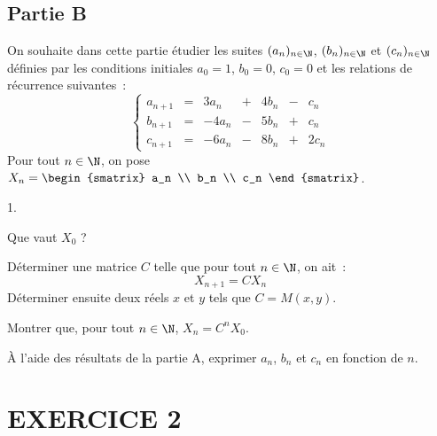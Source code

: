  \newpage
 
 \subsection*{Partie B}

 \noindent 
 On souhaite dans cette partie étudier les suites $(a_n)_{n 
 \in \N}$, $(b_n)_{n \in \N}$ et $(c_n)_{n \in 
 \N}$ définies par les conditions initiales $a_0=1$, $b_0=0$, 
 $c_0=0$ et les relations de récurrence suivantes~:
 \[ 
  \left\{ 
  \begin{array}{rcrrrrr} 
  a_{n+1} & = & 3 a_n & + & 4 b_n & - & c_n \\ 
  b_{n+1} & = & -4 a_n & - & 5 b_n & + & c_n \\ 
  c_{n+1} & = & -6 a_n & - & 8 b_n & + & 2 c_n 
  \end{array} 
  \right. 
 \]
 Pour tout $n \in \N$, on pose $X_n = 
 \begin{smatrix} 
 a_n \\ 
 b_n \\ 
 c_n 
 \end{smatrix}$.
\begin{noliste}{1.}
\setlength{\itemsep}{2mm}
\setcounter{enumi}{8}
\item Que vaut $X_0$ ?




\item Déterminer une matrice $C$ telle que pour tout $n \in \N$, on
  ait~:
  \[ 
  X_{n+1} = C X_n 
  \]
  Déterminer ensuite deux réels $x$ et $y$ tels que $C = M(x,y)$.
  





\item Montrer que, pour tout $n \in \N$, $X_n = C^n X_0$.

  

\item À l'aide des résultats de la partie A, exprimer $a_n$, $b_n$ et 
$c_n$ en fonction de $n$.



\end{noliste}




\section*{EXERCICE 2}

